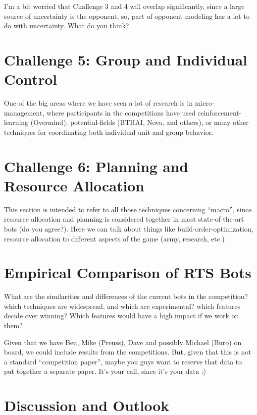 \documentclass[journal]{IEEEtran}
\begin{document}
{\color{red} I'm a bit worried that Challenge 3 and 4 will overlap significantly, since a large source of uncertainty is the opponent, so, part of opponent modeling has a lot to do with uncertainty. What do you think?}

\section{Challenge 5: Group and Individual Control}\label{sec:micro}

{\color{blue}
One of the big areas where we have seen a lot of research is in micro-management, where participants in the competitions have used reinforcement-learning (Overmind), potential-fields (BTHAI, Nova, and others), or many other techniques for coordinating both individual unit and group behavior.
}

\section{Challenge 6: Planning and Resource Allocation}\label{sec:planning}

{\color{blue}
This section is intended to refer to all those techniques concerning ``macro'', since resource allocation and planning is considered together in most state-of-the-art bots (do you agree?). Here we can talk about things like build-order-optimization, resource allocation to different aspects of the game (army, research, etc.)
}



\section{Empirical Comparison of RTS Bots}\label{sec:experiments}

{\color{blue}
What are the similarities and differences of the current bots in the competition? which techniques are widespread, and which are experimental? which features decide over winning? Which features would have a high impact if we work on them?
}

{\color{red} Given that we have Ben, Mike (Preuss), Dave and possibly Michael (Buro) on board, we could include results from the competitions. But, given that this is not a standard ``competition paper'', maybe you guys want to reserve that data to put together a separate paper. It's your call, since it's your data :)}
	
\section{Discussion and Outlook}\label{sec:conclusions}
	
\end{document}
